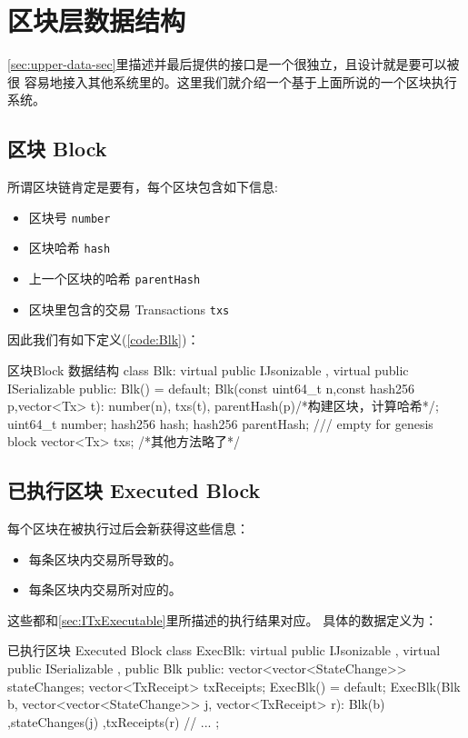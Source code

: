 \section{区块层数据结构}
\label{sec:Block-Exec}

\cref{sec:upper-data-sec}里描述并最后提供的接口是一个很独立，且设计就是要可以被很
容易地接入其他系统里的。这里我们就介绍一个基于上面所说的一个区块执行系统。

\subsection{区块 Block}
\label{sec:Blk}


所谓区块链肯定是要有，每个区块包含如下信息:
\begin{itemize}
\item 区块号 \texttt{number}
\item 区块哈希 \texttt{hash}
\item 上一个区块的哈希 \texttt{parentHash}
\item 区块里包含的交易 Transactions \texttt{txs}
\end{itemize}
因此我们有如下定义(\cref{code:Blk})：
\begin{numberedc}{区块Block 数据结构}{\label{code:Blk}}
class Blk: virtual public IJsonizable
         , virtual public ISerializable {
public:
  Blk() = default;
  Blk(const uint64_t n,const hash256 p,vector<Tx> t):
    number(n),
    txs(t),
    parentHash(p){/*构建区块，计算哈希*/};
  uint64_t number;
  hash256 hash;
  hash256 parentHash; /// empty for genesis block
  vector<Tx> txs;
  /*其他方法略了*/
}
\end{numberedc}

\subsection{已执行区块 Executed Block}
\label{sec:ExecBlk}

每个区块在被执行过后会新获得这些信息：
\begin{itemize}
\item 每条区块内交易所导致的。
\item 每条区块内交易所对应的。
\end{itemize}

这些都和\cref{sec:ITxExecutable}里所描述的执行结果对应。
具体的数据定义为：
\begin{numberedc}{已执行区块  Executed Block}{\label{code:ExecBlk}}
class ExecBlk: virtual public IJsonizable
             , virtual public ISerializable
             , public Blk{
public:
  vector<vector<StateChange>> stateChanges;
  vector<TxReceipt> txReceipts;
  ExecBlk() = default;
  ExecBlk(Blk b,
          vector<vector<StateChange>> j,
          vector<TxReceipt> r): Blk(b)
                              ,stateChanges(j)
                              ,txReceipts(r){
    // ...
  }
};
\end{numberedc}

